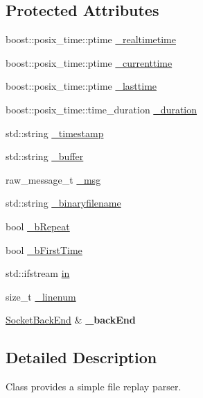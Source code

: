 \subsection*{Protected Attributes}
\begin{DoxyCompactItemize}
\item 
boost\+::posix\+\_\+time\+::ptime \hyperlink{class_socket_parser_a62a7a4fab1e5fd28f03d84b50a12ad94}{\+\_\+realtimetime}
\item 
boost\+::posix\+\_\+time\+::ptime \hyperlink{class_socket_parser_a2a4fdde47af625d6ecb471529b64a896}{\+\_\+currenttime}
\item 
boost\+::posix\+\_\+time\+::ptime \hyperlink{class_socket_parser_ac6c26c2ff2af1aae99641a00ee5ffe59}{\+\_\+lasttime}
\item 
boost\+::posix\+\_\+time\+::time\+\_\+duration \hyperlink{class_socket_parser_a2ad0ff35350e4a1624d895554902b7dd}{\+\_\+duration}
\item 
std\+::string \hyperlink{class_socket_parser_ab01ef675f49307a6e53230370e7087a5}{\+\_\+timestamp}
\item 
std\+::string \hyperlink{class_socket_parser_ac7450e06ee955973ca119c23b4e561c7}{\+\_\+buffer}
\item 
raw\+\_\+message\+\_\+t \hyperlink{class_socket_parser_ae24e2dee6193c39465ec0f1326d62f8a}{\+\_\+msg}
\item 
std\+::string \hyperlink{class_socket_parser_ab0ede591a09aea0a188448374b32623a}{\+\_\+binaryfilename}
\item 
bool \hyperlink{class_socket_parser_a53078737346e16dedb484081796bfc08}{\+\_\+b\+Repeat}
\item 
bool \hyperlink{class_socket_parser_a8f60d419bee68bb8aa83e27f18ccb5ec}{\+\_\+b\+First\+Time}
\item 
std\+::ifstream \hyperlink{class_socket_parser_ace4efb971e7adbd8f3053eb06f23d0e8}{in}
\item 
size\+\_\+t \hyperlink{class_socket_parser_afd07458ad5df143cfe01dde2f3669272}{\+\_\+linenum}
\item 
\hypertarget{class_socket_parser_a28a4003d4b00b53033fa08bf732317e6}{}\hyperlink{class_socket_back_end}{Socket\+Back\+End} \& {\bfseries \+\_\+back\+End}\label{class_socket_parser_a28a4003d4b00b53033fa08bf732317e6}

\end{DoxyCompactItemize}


\subsection{Detailed Description}
Class provides a simple file replay parser. 

